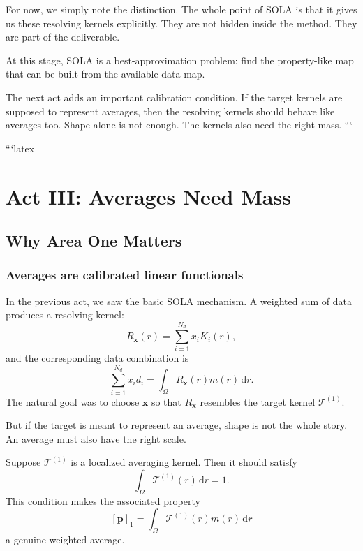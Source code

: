\documentclass[11pt,openany]{book}
\theoremstyle{definition}
\theoremstyle{remark}
\newcommand{\dd}{\,\mathrm d}
\begin{document}
For now, we simply note the distinction. The whole point of SOLA is that it gives us these
resolving kernels explicitly. They are not hidden inside the method. They are part of the
deliverable.

\begin{lessonbox}
At this stage, SOLA is a best-approximation problem: find the property-like map that can be
built from the available data map.
\end{lessonbox}

The next act adds an important calibration condition. If the target kernels are supposed to
represent averages, then the resolving kernels should behave like averages too. Shape alone is
not enough. The kernels also need the right mass.
```


```latex

\part{Act III: Averages Need Mass}

\chapter{Why Area One Matters}

\section{Averages are calibrated linear functionals}

In the previous act, we saw the basic SOLA mechanism. A weighted sum of data produces a
resolving kernel:
\[
  R_{\mathbf x}(r)
  =
  \sum_{i=1}^{N_d}x_iK_i(r),
\]
and the corresponding data combination is
\[
  \sum_{i=1}^{N_d}x_id_i
  =
  \int_\Omega R_{\mathbf x}(r)m(r)\dd r.
\]
The natural goal was to choose \(\mathbf x\) so that \(R_{\mathbf x}\) resembles the target kernel
\(\mathcal T^{(1)}\).

But if the target is meant to represent an average, shape is not the whole story. An average must
also have the right scale.

Suppose \(\mathcal T^{(1)}\) is a localized averaging kernel. Then it should satisfy
\[
  \int_\Omega \mathcal T^{(1)}(r)\dd r=1.
\]
This condition makes the associated property
\[
  [\mathbf p]_1
  =
  \int_\Omega \mathcal T^{(1)}(r)m(r)\dd r
\]
a genuine weighted average.
\end{document}
